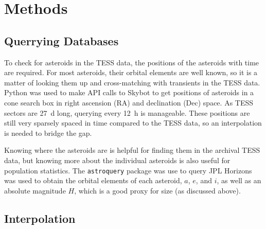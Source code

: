 \documentclass{UCreport}
\begin{document}
\section{Methods}\label{Sec:Meth}

\subsection{Querrying Databases}\label{SubSec:Querry}

To check for asteroids in the TESS data, the positions of the asteroids with time are required.
For most asteroids, their orbital elements are well known, so it is a matter of looking them up and cross-matching with transients in the TESS data.
Python was used to make API calls to
Skybot \citep{Berthier2006} to get positions of asteroids in a cone search box in right ascension (RA) and  declination (Dec) space.
As TESS sectors are \qty{27}{\day} long, querying every \qty{12}{\hour} is manageable.
These positions are still very sparsely spaced in time compared to the TESS data, so an interpolation is needed to bridge the gap.

Knowing where the asteroids are is helpful for finding them in the archival TESS data, but knowing more about the individual asteroids is also useful for population statistics.
The \texttt{astroquery} \citep{Ginsburg2019} package was use to query JPL Horizons%
was used to obtain the orbital elements of each asteroid, $a$, $e$, and $i$, as well as an absolute magnitude $H$, which is a good proxy for size (as discussed above). %



\subsection{Interpolation}\label{SubSec:Interp}
\end{document}
